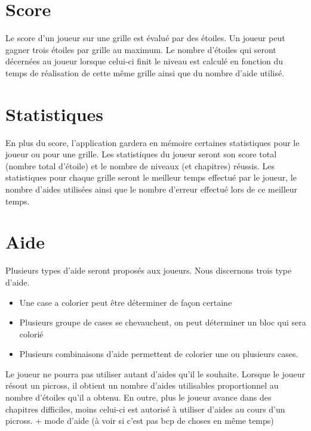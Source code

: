 \documentclass{report}
\begin{document}
		
		\section{Score}
			Le score d'un joueur sur une grille est évalué par des étoiles. Un joueur peut gagner trois étoiles par grille au maximum. Le nombre d'étoiles qui seront décernées au joueur lorsque celui-ci finit le niveau est calculé en fonction du temps de réalisation de cette même grille ainsi que du nombre d'aide utilisé.
			
		\section{Statistiques}
			En plus du score, l'application gardera en mémoire certaines statistiques pour le joueur ou pour une grille. Les statistiques du joueur seront son score total (nombre total d'étoile) et le nombre de niveaux (et chapitres) réussis. Les statistiques pour chaque grille seront le meilleur temps effectué par le joueur, le nombre d'aides utilisées ainsi que le nombre d'erreur effectué lors de ce meilleur temps.
			
		\section{Aide}
			Plusieurs types d'aide seront proposés aux joueurs. Nous discernons trois type d'aide.
			\begin{itemize}
			    \item Une case a colorier peut être déterminer de façon certaine
			    \item Plusieurs groupe de cases se chevauchent, on peut déterminer un bloc qui sera colorié
			    \item Plusieurs combinaisons d'aide permettent de colorier une ou plusieurs cases.
			\end{itemize}
			Le joueur ne pourra pas utiliser autant d'aides qu'il le souhaite. Lorsque le joueur résout un picross, il obtient un nombre d'aides utilisables proportionnel au nombre d'étoiles qu'il a obtenu. En outre, plus le joueur avance dans des chapitres difficiles, moins celui-ci est autorisé à utiliser d'aides au cours d'un picross. + mode d'aide (à voir si c'est pas bcp de choses en même temps)
\end{document}
